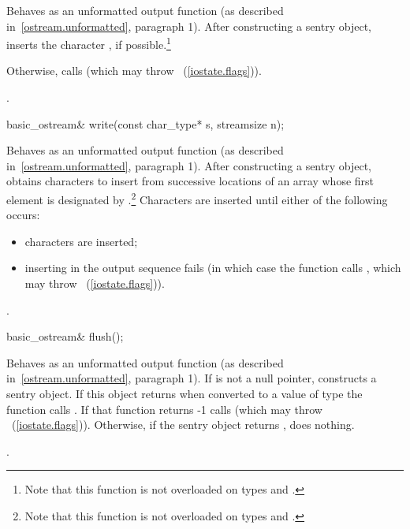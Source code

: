 \begin{itemdescr}
\pnum
\effects
Behaves as an unformatted output function (as described in~\ref{ostream.unformatted}, paragraph 1).
After constructing a sentry
object, inserts
the character , if possible.\footnote{Note that this function is not overloaded on types
and
.}

\pnum
Otherwise, calls
(which may throw
~(\ref{iostate.flags})).

\pnum
\returns
{}.
\end{itemdescr}

%
\begin{itemdecl}
basic_ostream& write(const char_type* s, streamsize n);
\end{itemdecl}

\begin{itemdescr}
\pnum
\effects
Behaves as an unformatted output function (as described in~\ref{ostream.unformatted}, paragraph 1).  After constructing a sentry
object, obtains
characters to insert from
successive locations of an array whose first element is designated by
.\footnote{Note that this function is not overloaded on types
and
.}
Characters are inserted until either of the following occurs:
\begin{itemize}
\item
{} characters are inserted;
\item
inserting in the output sequence fails
(in which case the function calls
,
which may throw
~(\ref{iostate.flags})).
\end{itemize}

\pnum
\returns
{}.
\end{itemdescr}

%
\begin{itemdecl}
basic_ostream& flush();
\end{itemdecl}

\begin{itemdescr}
\pnum
\effects Behaves as an unformatted output function (as described in~\ref{ostream.unformatted}, paragraph 1).
If
is not a null pointer,
constructs a sentry object. If this object returns  when converted to a value of type  the function
calls
.
If that function returns -1
calls
(which may throw
~(\ref{iostate.flags})).
Otherwise, if the sentry object returns , does nothing.

\pnum
\returns
{}.
\end{itemdescr}

